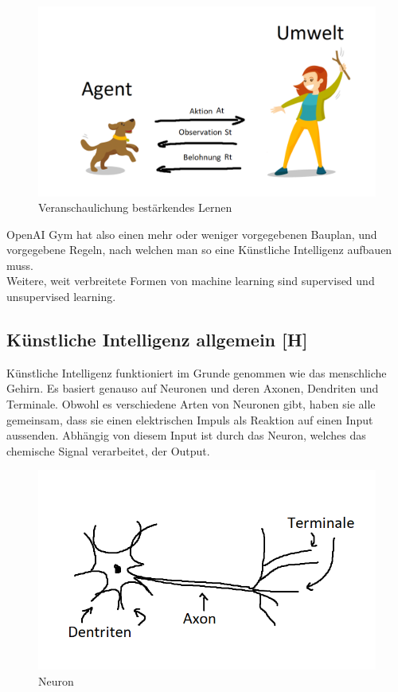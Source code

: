\begin{figure}[H]
    \centering
    \includegraphics[scale=0.6]{pics/reinforcementLearningConcept.png}
    \caption{Veranschaulichung bestärkendes Lernen}
\end{figure}

OpenAI Gym hat also einen mehr oder weniger vorgegebenen Bauplan, und vorgegebene Regeln, nach welchen man
so eine Künstliche Intelligenz aufbauen muss. \\
Weitere, weit verbreitete Formen von machine learning sind supervised und unsupervised learning.

\subsection{Künstliche Intelligenz allgemein [H]}
Künstliche Intelligenz funktioniert im Grunde genommen wie das menschliche Gehirn. Es basiert genauso auf Neuronen und deren Axonen, Dendriten und Terminale. Obwohl es verschiedene Arten von Neuronen gibt, haben sie alle gemeinsam, dass sie einen elektrischen Impuls als Reaktion auf einen Input aussenden. Abhängig von diesem Input ist durch das Neuron, welches das chemische Signal verarbeitet, der Output.

\begin{figure}[H]
    \centering
    \includegraphics[scale=1]{pics/Neuron.png}
    \caption{Neuron}
    \label{fig:tech:Neuron}
\end{figure}

